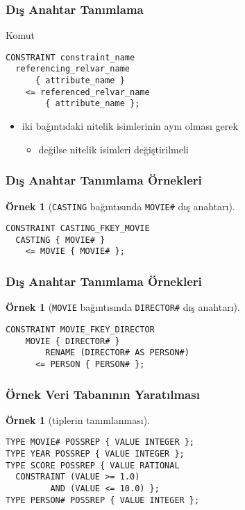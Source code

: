 \documentclass[dvipsnames]{beamer}
\theoremstyle{definition}
\theoremstyle{example}
\newtheorem{ornek}[theorem]{Örnek}
\theoremstyle{plain}
\begin{document}
\begin{frame}[fragile]
  \frametitle{Dış Anahtar Tanımlama}

  \begin{block}{Komut}
    \begin{lstlisting}
CONSTRAINT constraint_name
  referencing_relvar_name
      { attribute_name }
    <= referenced_relvar_name
        { attribute_name };
    \end{lstlisting}
  \end{block}

  \begin{itemize}
    \item iki bağıntıdaki nitelik isimlerinin aynı olması gerek
    \begin{itemize}
      \item değilse nitelik isimleri değiştirilmeli
    \end{itemize}
  \end{itemize}
\end{frame}

\begin{frame}[fragile]
  \frametitle{Dış Anahtar Tanımlama Örnekleri}

  \begin{ornek}[\texttt{CASTING} bağıntısında \texttt{MOVIE\#} dış anahtarı]
    \begin{lstlisting}
CONSTRAINT CASTING_FKEY_MOVIE
  CASTING { MOVIE# }
    <= MOVIE { MOVIE# };
    \end{lstlisting}
  \end{ornek}
\end{frame}

\begin{frame}[fragile]
  \frametitle{Dış Anahtar Tanımlama Örnekleri}

  \begin{ornek}[\texttt{MOVIE} bağıntısında \texttt{DIRECTOR\#} dış anahtarı]
    \begin{lstlisting}
CONSTRAINT MOVIE_FKEY_DIRECTOR
    MOVIE { DIRECTOR# }
        RENAME (DIRECTOR# AS PERSON#)
      <= PERSON { PERSON# };
    \end{lstlisting}
  \end{ornek}
\end{frame}

\begin{frame}[fragile]
  \frametitle{Örnek Veri Tabanının Yaratılması}

  \begin{ornek}[tiplerin tanımlanması]
    \begin{lstlisting}
TYPE MOVIE# POSSREP { VALUE INTEGER };
TYPE YEAR POSSREP { VALUE INTEGER };
TYPE SCORE POSSREP { VALUE RATIONAL
  CONSTRAINT (VALUE >= 1.0)
         AND (VALUE <= 10.0) };
TYPE PERSON# POSSREP { VALUE INTEGER };
    \end{lstlisting}
  \end{ornek}
\end{frame}
\end{document}
